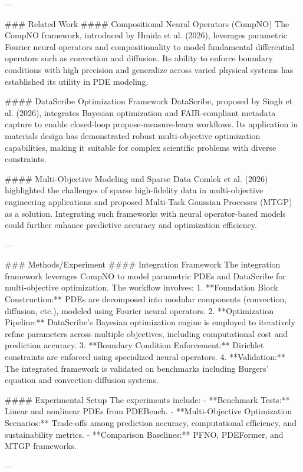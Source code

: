 ---

### Related Work  
#### Compositional Neural Operators (CompNO)  
The CompNO framework, introduced by Hmida et al. (2026), leverages parametric Fourier neural operators and compositionality to model fundamental differential operators such as convection and diffusion. Its ability to enforce boundary conditions with high precision and generalize across varied physical systems has established its utility in PDE modeling.

#### DataScribe Optimization Framework  
DataScribe, proposed by Singh et al. (2026), integrates Bayesian optimization and FAIR-compliant metadata capture to enable closed-loop propose-measure-learn workflows. Its application in materials design has demonstrated robust multi-objective optimization capabilities, making it suitable for complex scientific problems with diverse constraints.

#### Multi-Objective Modeling and Sparse Data  
Comlek et al. (2026) highlighted the challenges of sparse high-fidelity data in multi-objective engineering applications and proposed Multi-Task Gaussian Processes (MTGP) as a solution. Integrating such frameworks with neural operator-based models could further enhance predictive accuracy and optimization efficiency.

---

### Methods/Experiment  
#### Integration Framework  
The integration framework leverages CompNO to model parametric PDEs and DataScribe for multi-objective optimization. The workflow involves:  
1. **Foundation Block Construction:** PDEs are decomposed into modular components (convection, diffusion, etc.), modeled using Fourier neural operators.  
2. **Optimization Pipeline:** DataScribe's Bayesian optimization engine is employed to iteratively refine parameters across multiple objectives, including computational cost and prediction accuracy.  
3. **Boundary Condition Enforcement:** Dirichlet constraints are enforced using specialized neural operators.  
4. **Validation:** The integrated framework is validated on benchmarks including Burgers' equation and convection-diffusion systems.

#### Experimental Setup  
The experiments include:  
- **Benchmark Tests:** Linear and nonlinear PDEs from PDEBench.  
- **Multi-Objective Optimization Scenarios:** Trade-offs among prediction accuracy, computational efficiency, and sustainability metrics.  
- **Comparison Baselines:** PFNO, PDEFormer, and MTGP frameworks.

---

